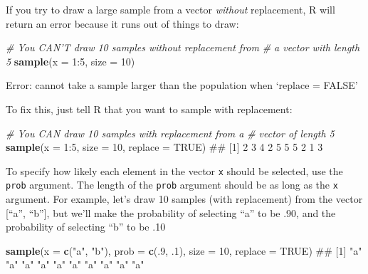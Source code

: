 \documentclass[]{book}
\newenvironment{Shaded}{\begin{snugshade}}{\end{snugshade}}
\newcommand{\KeywordTok}[1]{\textcolor[rgb]{0.13,0.29,0.53}{\textbf{{#1}}}}
\newcommand{\DataTypeTok}[1]{\textcolor[rgb]{0.13,0.29,0.53}{{#1}}}
\newcommand{\DecValTok}[1]{\textcolor[rgb]{0.00,0.00,0.81}{{#1}}}
\newcommand{\StringTok}[1]{\textcolor[rgb]{0.31,0.60,0.02}{{#1}}}
\newcommand{\CommentTok}[1]{\textcolor[rgb]{0.56,0.35,0.01}{\textit{{#1}}}}
\newcommand{\OtherTok}[1]{\textcolor[rgb]{0.56,0.35,0.01}{{#1}}}
\newcommand{\NormalTok}[1]{{#1}}
\theoremstyle{definition}
\theoremstyle{definition}
\theoremstyle{remark}
\begin{document}
If you try to draw a large sample from a vector \textit{without}
replacement, R will return an error because it runs out of things to
draw:

\begin{Shaded}
\begin{Highlighting}[]
\CommentTok{# You CAN'T draw 10 samples without replacement from}
\CommentTok{#  a vector with length 5}
\KeywordTok{sample}\NormalTok{(}\DataTypeTok{x =} \DecValTok{1}\NormalTok{:}\DecValTok{5}\NormalTok{, }\DataTypeTok{size =} \DecValTok{10}\NormalTok{)}
\end{Highlighting}
\end{Shaded}

Error: cannot take a sample larger than the population when `replace =
FALSE'

To fix this, just tell R that you want to sample with replacement:

\begin{Shaded}
\begin{Highlighting}[]
\CommentTok{# You CAN draw 10 samples with replacement from a}
\CommentTok{#  vector of length 5}
\KeywordTok{sample}\NormalTok{(}\DataTypeTok{x =} \DecValTok{1}\NormalTok{:}\DecValTok{5}\NormalTok{, }\DataTypeTok{size =} \DecValTok{10}\NormalTok{, }\DataTypeTok{replace =} \OtherTok{TRUE}\NormalTok{)}
\NormalTok{##  [1] 2 3 4 2 5 5 5 2 1 3}
\end{Highlighting}
\end{Shaded}

To specify how likely each element in the vector \texttt{x} should be
selected, use the \texttt{prob} argument. The length of the
\texttt{prob} argument should be as long as the \texttt{x} argument. For
example, let's draw 10 samples (with replacement) from the vector
{[}``a'', ``b''{]}, but we'll make the probability of selecting ``a'' to
be .90, and the probability of selecting ``b'' to be .10

\begin{Shaded}
\begin{Highlighting}[]
\KeywordTok{sample}\NormalTok{(}\DataTypeTok{x =} \KeywordTok{c}\NormalTok{(}\StringTok{"a"}\NormalTok{, }\StringTok{"b"}\NormalTok{), }
       \DataTypeTok{prob =} \KeywordTok{c}\NormalTok{(.}\DecValTok{9}\NormalTok{, .}\DecValTok{1}\NormalTok{),}
       \DataTypeTok{size =} \DecValTok{10}\NormalTok{, }
       \DataTypeTok{replace =} \OtherTok{TRUE}\NormalTok{)}
\NormalTok{##  [1] "a" "a" "a" "a" "a" "a" "a" "a" "a" "a"}
\end{Highlighting}
\end{Shaded}
\end{document}
